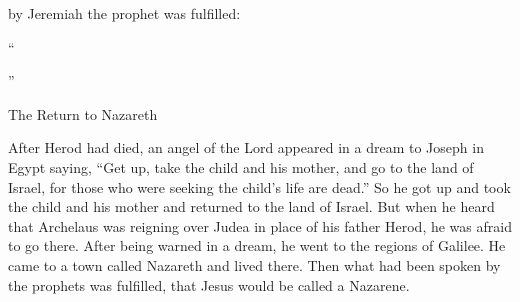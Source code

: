 {by
Jeremiah
the prophet
was fulfilled:
\par }{\Q {}“{}
\par }{
\par }{
\par }{”
\par }{\SH The Return to Nazareth
\par }{\PP {}After
Herod
had died,
an angel
of the Lord
appeared
in
a dream
to Joseph
in
Egypt
saying,
“Get up,
take
the child
and
his
mother,
and
go
to
the land
of Israel,
for
those
who were seeking
the child’s
life
are dead.”
So
he got up
and took
the child
and
his
mother
and
returned
to
the land
of Israel.
But
when he heard
that
Archelaus
was reigning
over Judea
in place of
his
father
Herod,
he was afraid
to go
there.
After being warned
in
a dream,
he went
to
the regions
of Galilee.
He
came
to
a town
called
Nazareth
and lived
there. Then what
had been spoken
by
the prophets
was fulfilled,
that
Jesus would be called
a Nazarene.

}
